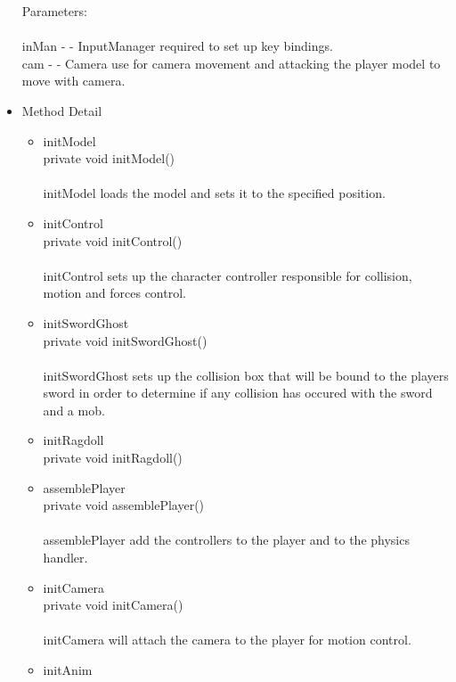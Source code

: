 \documentclass[letterpaper]{article}
\begin{document}
\begin{itemize}
												Parameters: \\ \\
												inMan - - InputManager required to set up key bindings. \\
												cam - - Camera use for camera movement and attacking the player model to move with camera. \\
										\item	Method Detail 
												\begin{itemize}
													\item	initModel \\
															private void initModel() \\ \\
															initModel loads the model and sets it to the specified position. \\
													\item	initControl \\
															private void initControl() \\ \\
															initControl sets up the character controller responsible for collision, motion and forces control.
													\item	initSwordGhost \\
															private void initSwordGhost() \\ \\
															initSwordGhost sets up the collision box that will be bound to the players sword in order to determine if any collision has occured with the sword and a mob.
													\item	initRagdoll \\
															private void initRagdoll() \\
													\item	assemblePlayer \\
															private void assemblePlayer() \\ \\
															assemblePlayer add the controllers to the player and to the physics handler. \\
													\item	initCamera \\
															private void initCamera() \\ \\
															initCamera will attach the camera to the player for motion control. \\
													\item	initAnim \\

\end{itemize}
\end{itemize}
\end{document}

